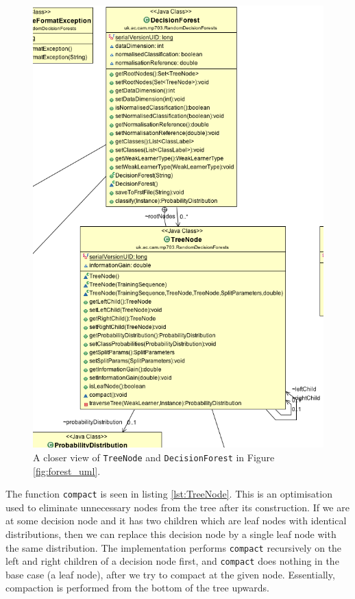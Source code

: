 \documentclass[12pt,twoside,notitlepage]{report}
\begin{document}
                \begin{figure}[H]
                    \centering
                    \includegraphics[scale=0.5]{Tree_Forest_UML}
                    \caption{A closer view of \texttt{TreeNode} and \texttt{DecisionForest} in Figure \ref{fig:forest_uml}.}
                    \label{fig:weak_learner_uml}
                \end{figure}

                The function \texttt{compact} is seen in listing \ref{lst:TreeNode}. This is an optimisation 
                used to eliminate unnecessary nodes from the tree after its construction. If we are at 
                some decision node and it has two children which are leaf nodes with identical distributions, then we 
                can replace this decision node by a single leaf node with the same distribution. The implementation 
                performs \texttt{compact} recursively on the left and right children of a decision node first, 
                and \texttt{compact} does nothing in the base case (a leaf node), after we try to compact at the 
                given node. Essentially, compaction is performed from the bottom of the tree upwards.
\end{document}

